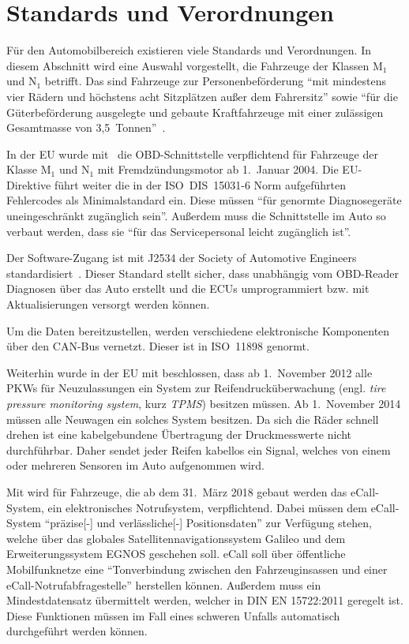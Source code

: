\section{Standards und Verordnungen}\label{ch:standards}
Für den Automobilbereich existieren viele Standards und Verordnungen. In diesem
Abschnitt wird eine Auswahl vorgestellt, die Fahrzeuge der Klassen M$_1$ und
N$_1$ betrifft. Das sind Fahrzeuge zur Personenbeförderung
\enquote{mit mindestens vier Rädern und höchstens acht Sitzplätzen außer dem Fahrersitz}
sowie \enquote{für die Güterbeförderung ausgelegte und gebaute Kraftfahrzeuge
mit einer zulässigen Gesamtmasse von
3,5~Tonnen}~\cite{Richtlinie70/156/EWG:Fahrzeugklassen}.

In der EU wurde mit~\cite{EUDirective98/69/EC} die OBD-Schnittstelle
verpflichtend für Fahrzeuge der Klasse M$_1$ und N$_1$ mit Fremdzündungsmotor
ab 1.~Januar 2004. Die EU-Direktive führt weiter die in der ISO~DIS~15031-6
Norm aufgeführten Fehlercodes als Minimalstandard ein. Diese müssen
\enquote{für genormte Diagnosegeräte \elide uneingeschränkt zugänglich sein}.
Außerdem muss die Schnittstelle im Auto so verbaut werden, dass sie
\enquote{für das Servicepersonal leicht zugänglich \elide ist}.

Der Software-Zugang ist mit J2534 der Society of Automotive Engineers
standardisiert~\cite{SAE2004}. Dieser Standard stellt sicher, dass unabhängig
vom OBD-Reader Diagnosen über das Auto erstellt und die ECUs umprogrammiert
bzw. mit Aktualisierungen versorgt werden können.

Um die Daten bereitzustellen, werden verschiedene elektronische Komponenten
über den CAN-Bus vernetzt. Dieser ist in ISO~11898 genormt.

Weiterhin wurde in der EU mit \cite{EURegulation661/2009} beschlossen, dass ab
1.~November 2012 alle PKWs für Neuzulassungen ein System zur
Reifendrucküberwachung (engl. \textit{tire pressure monitoring system}, kurz
\textit{TPMS}) besitzen müssen. Ab 1.~November 2014 müssen alle Neuwagen ein
solches System besitzen. Da sich die Räder schnell drehen ist eine
kabelgebundene Übertragung der Druckmesswerte nicht durchführbar. Daher sendet
jeder Reifen kabellos ein Signal, welches von einem oder mehreren Sensoren im
Auto aufgenommen wird.

Mit \cite{EURegulation2015/ecall} wird für Fahrzeuge, die ab dem 31.~März 2018
gebaut werden das eCall-System, ein elektronisches Notrufsystem, verpflichtend.
Dabei müssen dem eCall-System \enquote{präzise\mbox{[-]} und verlässliche\mbox{[-]}
Positionsdaten} zur Verfügung stehen, welche über das globales
Satellitennavigationssystem Galileo und dem Erweiterungssystem EGNOS geschehen
soll. eCall soll über öffentliche Mobilfunknetze eine \enquote{Tonverbindung
zwischen den Fahrzeuginsassen und einer eCall-Notrufabfragestelle} herstellen
können. Außerdem muss ein Mindestdatensatz übermittelt werden, welcher in
DIN EN 15722:2011 geregelt ist. Diese Funktionen müssen im Fall eines schweren
Unfalls automatisch durchgeführt werden können.
